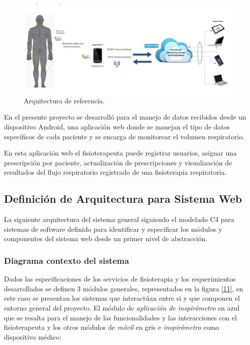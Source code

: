 \documentclass[12pt]{article}
\begin{document}
\begin{figure}[ht]
\centering
\includegraphics[scale=0.4]{imag/ArquitecturaREF.png}
\caption{Arquitectura de referencia. } %
\label{10}
\end{figure}
\FloatBarrier

En el presente proyecto se desarrolló para el manejo de datos recibidos desde un dispositivo Android, una aplicación web donde se manejan el tipo de datos específicos de cada paciente y se encarga de monitorear el volumen respiratorio.

En esta aplicación web el fisioterapeuta puede registrar usuarios, asignar una prescripción por paciente, actualización de prescripciones y visualización de resultados del flujo respiratorio registrado de una fisioterapia respiratoria.




\subsection{Definición de Arquitectura para Sistema Web}

La siguiente arquitectura del sistema general siguiendo el modelado C4 para sistemas de software  definido para identificar y especificar los módulos y componentes del sistema web desde un primer nivel de abstracción.

\subsubsection{Diagrama contexto del sistema}

Dados las especificaciones de los servicios de fisioterapia y los requerimientos desarrollados se definen 3 módulos generales, representados en la figura \ref{11}, en este caso se presentan los sistemas que interactúan entre si y que componen el entorno general del proyecto. El módulo de \textit{aplicación de inspirómetro} en azul que se resalta para el manejo de las funcionalidades y las interacciones con el fisioterapeuta y los otros módulos de \textit{móvil} en gris e \textit{inspirómetro} como dispositivo médico:
\end{document}
